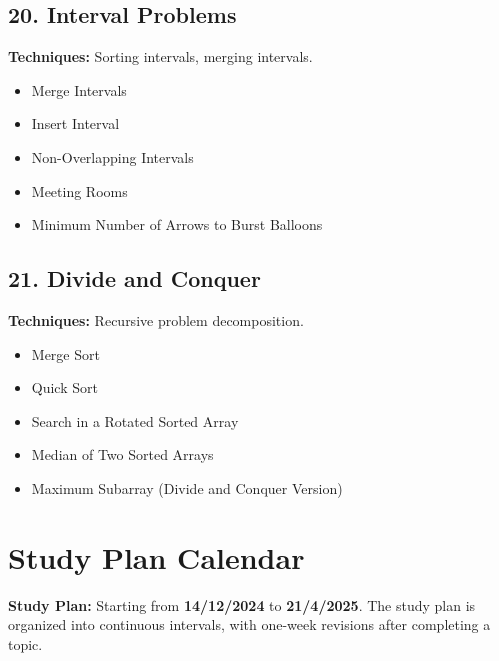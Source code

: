 \documentclass{article}
\begin{document}
\subsection*{20. Interval Problems}
\textbf{Techniques:} Sorting intervals, merging intervals.
\begin{itemize}[noitemsep]
    \item Merge Intervals
    \item Insert Interval
    \item Non-Overlapping Intervals
    \item Meeting Rooms
    \item Minimum Number of Arrows to Burst Balloons
\end{itemize}

\subsection*{21. Divide and Conquer}
\textbf{Techniques:} Recursive problem decomposition.
\begin{itemize}[noitemsep]
    \item Merge Sort
    \item Quick Sort
    \item Search in a Rotated Sorted Array
    \item Median of Two Sorted Arrays
    \item Maximum Subarray (Divide and Conquer Version)
\end{itemize}

\section*{Study Plan Calendar}

\textbf{Study Plan:} Starting from \textbf{14/12/2024} to \textbf{21/4/2025}. The study plan is organized into continuous intervals, with one-week revisions after completing a topic.
\end{document}
